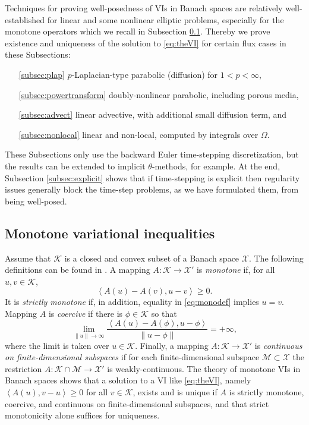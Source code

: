 \documentclass[final,onefignum]{siamart190516}
\newcommand{\ip}[2]{\ensuremath{\left<#1,#2\right>}}
\begin{document}
Techniques for proving well-posedness of VIs in Banach spaces are relatively well-established for linear and some nonlinear elliptic problems, especially for the monotone operators \cite{KinderlehrerStampacchia1980} which we recall in Subsection \ref{subsec:mono}.  Thereby we prove existence and uniqueness of the solution to \eqref{eq:theVI} for certain flux cases in these Subsections:
\begin{itemize}
\item[\ref{subsec:plap}] $p$-Laplacian-type parabolic (diffusion) for $1<p<\infty$,
\item[\ref{subsec:powertransform}] doubly-nonlinear parabolic, including porous media,
\item[\ref{subsec:advect}] linear advective, with additional small diffusion term, and
\item[\ref{subsec:nonlocal}] linear and non-local, computed by integrals over $\Omega$.
\end{itemize}
These Subsections only use the backward Euler time-stepping discretization, but the results can be extended to implicit $\theta$-methods, for example.  At the end, Subsection \ref{subsec:explicit} shows that if time-stepping is explicit then regularity issues generally block the time-step problems, as we have formulated them, from being well-posed.

\subsection{Monotone variational inequalities} \label{subsec:mono}  Assume that $\mathcal{K}$ is a closed and convex subset of a Banach space $\mathcal{X}$.  The following definitions can be found in \cite{KinderlehrerStampacchia1980}.  A mapping $A : \mathcal{K} \to \mathcal{X}'$ is \emph{monotone} if, for all $u,v\in\mathcal{K}$,
\begin{equation}
   \ip{A(u) - A(v)}{u-v} \ge 0.  \label{eq:monodef}
\end{equation}
It is \emph{strictly monotone} if, in addition, equality in \eqref{eq:monodef} implies $u=v$.  Mapping $A$ is \emph{coercive} if there is $\phi\in \mathcal{K}$ so that
\begin{equation}
   \lim_{\|u\|\to\infty} \frac{\ip{A(u) - A(\phi)}{u-\phi}}{\|u-\phi\|} = +\infty, \label{eq:coercivedef}
\end{equation}
where the limit is taken over $u\in\mathcal{K}$.  Finally, a mapping $A : \mathcal{K} \to \mathcal{X}'$ is \emph{continuous on finite-dimensional subspaces} if for each finite-dimensional subspace $\mathcal{M} \subset \mathcal{X}$ the restriction $A : \mathcal{K}\cap \mathcal{M} \to \mathcal{X}'$ is weakly-continuous.  The theory of monotone VIs in Banach spaces \cite[chapter III]{KinderlehrerStampacchia1980} shows that a solution to a VI like \eqref{eq:theVI}, namely $\ip{A(u)}{v-u} \ge 0$ for all $v\in\mathcal{K}$, exists and is unique if $A$ is strictly monotone, coercive, and continuous on finite-dimensional subspaces, and that strict monotonicity alone suffices for uniqueness.
\end{document}
